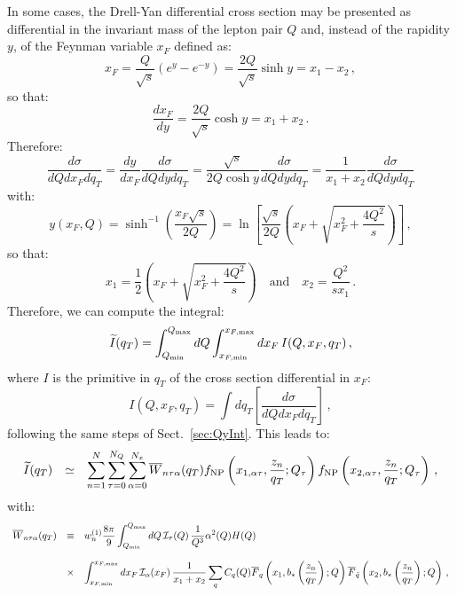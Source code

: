 \documentclass[10pt,a4paper]{article}
\begin{document}
In some cases, the Drell-Yan differential cross section may be
presented as differential in the invariant mass of the lepton pair $Q$
and, instead of the rapidity $y$, of the Feynman variable $x_F$
defined as:
\begin{equation}
  x_F = 
  \frac{Q}{\sqrt{s}}\left(e^{y} - e^{-y}\right) =
  \frac{2Q}{\sqrt{s}}\sinh y = x_1-x_2\,,
\end{equation}
so that:
\begin{equation}
\frac{dx_F}{dy} = \frac{2Q}{\sqrt{s}}\cosh y=x_1+x_2\,.
\end{equation}
Therefore:
\begin{equation}
  \frac{d\sigma}{dQ dx_F dq_T} =
  \frac{dy}{dx_F}\frac{d\sigma}{dQ dy dq_T}=
\frac{\sqrt{s}}{2Q\cosh y}\frac{d\sigma}{dQ dy dq_T}=\frac1{x_1+x_2}\frac{d\sigma}{dQ dy dq_T}
\end{equation}
with:
\begin{equation}
  y(x_F,Q) =
  \sinh^{-1}\left(\frac{x_F\sqrt{s}}{2Q}\right) =
  \ln\left[\frac{\sqrt{s}}{2Q}\left(x_F+\sqrt{x_F^2 + \frac{4Q^2}{s}}\right)\right]\,,
\end{equation}
so that:
\begin{equation}\label{eq:x12ofxFQ}
x_1 = \frac12\left(x_F+\sqrt{x_F^2 +
    \frac{4Q^2}{s}}\right)\quad\mbox{and}\quad x_2 = \frac{Q^2}{sx_1}\,.
\end{equation}
Therefore, we can compute the integral:
\begin{equation}
\widetilde{I}(q_T)=\int_{Q_{\rm min}}^{Q_{\rm max}}dQ \int_{x_{F,\rm
    min}}^{x_{F,\rm max}}dx_F\,I(Q,x_F,q_T)\,,
\end{equation}
where $I$ is the primitive in $q_T$ of the cross section differential
in $x_F$:
\begin{equation}
I(Q,x_F,q_T) = \int dq_T\left[\frac{d\sigma}{dQ dx_F dq_T}\right]\,,
\end{equation}
following the same steps of Sect.~\ref{sec:QyInt}. This leads to:
\begin{equation}
\begin{array}{rcl}
\displaystyle  \widetilde{I}(q_T) &\simeq& \displaystyle \sum_{n=1}^N
  \sum_{\tau=0}^{N_Q}\sum_{\alpha=0}^{N_x}\overline{W}_{n\tau\alpha}(q_T) f_{\rm NP}\left(x_{1,\alpha\tau},\frac{z_n}{q_T};Q_\tau\right) f_{\rm NP}\left(x_{2,\alpha\tau},\frac{z_n}{q_T};Q_\tau\right)\,,
\end{array}
\end{equation}
with:
\begin{equation}\label{eq:xFtens}
\begin{array}{rcl}
\displaystyle  \overline{W}_{n\tau\alpha}(q_T) &\equiv& \displaystyle w_n^{(1)}\frac{8\pi}{9} \int_{Q_{\rm min}}^{Q_{\rm max}}dQ\,\mathcal{I}_\tau(Q)\, 
  \frac{1}{Q^3} \alpha^2(Q) H(Q) 
\\
\\
&\times& \displaystyle 
                         \int_{x_{F,\rm
    min}}^{x_{F,\rm max}}dx_F\,\mathcal{I}_\alpha(x_F)\,\frac{1}{x_1+x_2} \sum_q C_q(Q)\overline{F}_q\left(x_1,b_*\left(\frac{z_n}{q_T}\right);Q\right)
                         \overline{F}_{\bar{q}}\left(x_2,b_*\left(\frac{z_n}{q_T}\right);Q\right)\,,
\end{array}
\end{equation}
\end{document}
